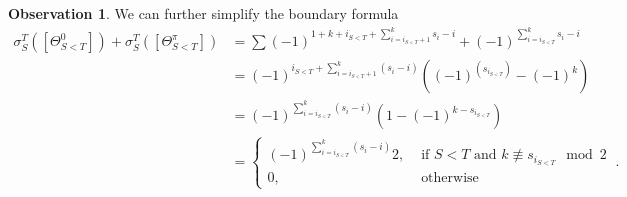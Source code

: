 \documentclass{article}
\newcommand{\msf}[1]{\mathsf{#1}}
\newcommand{\card}{\msf{card}}
\theoremstyle{definition}
\newtheorem{observation}[theorem]{Observation}
\begin{document}

\begin{observation}
    We can further simplify the boundary formula
    \begin{align*}
        \sigma_S^T([\Theta_{S<T}^0])+\sigma_S^T([\Theta_{S<T}^\pi]) 
        &= \sum (-1)^{1+k+i_{S<T}+\sum\limits_{i=i_{S<T}+1}^k s_i-i}+ 
                (-1)^{\sum\limits_{i=i_{S<T}}^k s_i-i} \\
        &= (-1)^{i_{S<T} + \sum_{i=i_{S<T}+1}^k (s_i-i)} \left( (-1)^{(s_{i_{S<T}})} - (-1)^k\right) \\
        &= (-1)^{\sum_{i=i_{S<T}}^k (s_i-i)}\left(1-(-1)^{k-s_{i_{S<T}}}\right) \\
        &= \begin{cases}
                (-1)^{\sum_{i=i_{S<T}}^k (s_i-i)} 2, &\text{ if } S<T \text{ and } k \not\equiv s_{i_{S<T}} \mod 2 \\
                0, &\text{ otherwise}
            \end{cases}~.
    \end{align*}
\end{observation}
\end{document}
